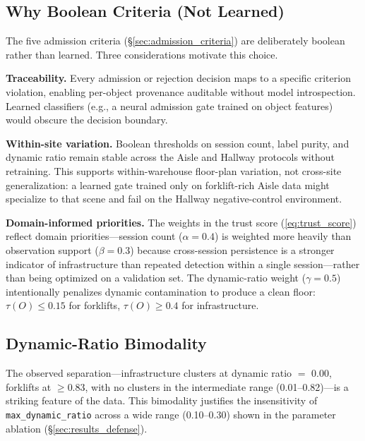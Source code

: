 \documentclass[journal]{IEEEtran}
\begin{document}

\subsection{Why Boolean Criteria (Not Learned)}
\label{sec:disc_boolean}

The five admission criteria (\S\ref{sec:admission_criteria}) are deliberately boolean rather than learned. Three considerations motivate this choice.

\textbf{Traceability.} Every admission or rejection decision maps to a specific criterion violation, enabling per-object provenance auditable without model introspection. Learned classifiers (e.g., a neural admission gate trained on object features) would obscure the decision boundary.

\textbf{Within-site variation.} Boolean thresholds on session count, label purity, and dynamic ratio remain stable across the Aisle and Hallway protocols without retraining. This supports within-warehouse floor-plan variation, not cross-site generalization: a learned gate trained only on forklift-rich Aisle data might specialize to that scene and fail on the Hallway negative-control environment.

\textbf{Domain-informed priorities.} The weights in the trust score (\ref{eq:trust_score}) reflect domain priorities---session count ($\alpha{=}0.4$) is weighted more heavily than observation support ($\beta{=}0.3$) because cross-session persistence is a stronger indicator of infrastructure than repeated detection within a single session---rather than being optimized on a validation set. The dynamic-ratio weight ($\gamma{=}0.5$) intentionally penalizes dynamic contamination to produce a clean floor: $\tau(O) \leq 0.15$ for forklifts, $\tau(O) \geq 0.4$ for infrastructure.

\subsection{Dynamic-Ratio Bimodality}
\label{sec:disc_bimodality}

The observed separation---infrastructure clusters at dynamic ratio $=$ 0.00, forklifts at $\geq$0.83, with no clusters in the intermediate range (0.01--0.82)---is a striking feature of the data. This bimodality justifies the insensitivity of \texttt{max\_dynamic\_ratio} across a wide range (0.10--0.30) shown in the parameter ablation (\S\ref{sec:results_defense}).
\end{document}
